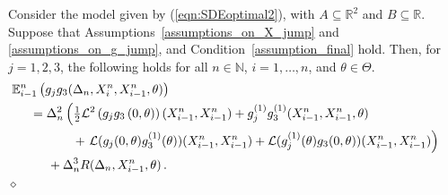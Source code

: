 \documentclass[11pt,a4paper]{article}
\newcommand{\xtl}{{X^n_{i-1}}}
\newcommand{\xtr}{X^n_i}
\newcommand{\EE}{{\mathbb E}}
\newcommand{\RR}{{\mathbb R}}
\newcommand{\NN}{{\mathbb N}}
\renewcommand{\ll}{{\mathcal{L}}}
\newcommand{\dqed}{{\leavevmode \unskip \penalty9999 \hbox{} \nobreak \hfill \quad \hbox{$\diamond$}}}
\numberwithin{equation}{section}
\numberwithin{theorem}{section}
\begin{document}
%
\begin{lemma}
Consider the model given by (\ref{eqn:SDEoptimal2}), with
  $A\subseteq \RR^2$ and $B\subseteq \RR$. Suppose that Assumptions~\ref{assumptions_on_X_jump} and
\ref{assumptions_on_g_jump}, and
Condition~\ref{assumption_final} hold. 
Then, for $j =
1,2,3$, the following holds for all $n\in \NN$, $i=1,\ldots,n$, and $\theta \in \Theta$.
\begin{align*}
\begin{split}
&\hspace{-5mm} \EE^n_{i-1}\left( g_{j}g_{3}(\Delta_n,\xtr,\xtl,
  \theta)\right)\\
&=\Delta_n^2\left( \tfrac{1}{2} \ll^2\left( g_{j}g_{3}\left(0,
      \theta\right)\right)(\xtl,\xtl) +
  g_{j}^{(1)}g_{3}^{(1)}(\xtl,\xtl, \theta)\right. \\
&\hspace{12mm} + \left.  \ll( g_{j}(0,
\theta)g_{3}^{(1)}(\theta))(\xtl,\xtl) + \ll( g_{j}^{(1)}(
\theta)g_{3}(0, \theta))(\xtl,\xtl) \right)\\
&\hspace{5mm} + \Delta_n^3 R(\Delta_n,\xtl, \theta)\,.
\end{split}
\end{align*}
\dqed
%
\label{lemma:expectations_rate}
\end{lemma}
%
\end{document}
